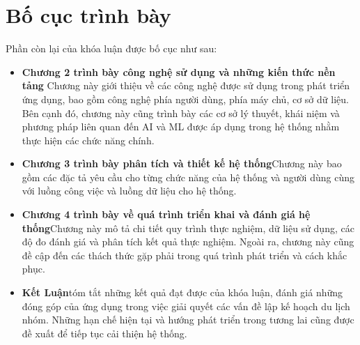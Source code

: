 \section{Bố cục trình bày}
Phần còn lại của khóa luận được bố cục như sau: 
\begin{itemize}
    \item \textbf{Chương 2 trình bày công nghệ sử dụng và những kiến thức nền tảng}\nl
    Chương này giới thiệu về các công nghệ được sử dụng trong phát triển ứng dụng, bao gồm công nghệ phía người dùng, phía máy chủ, cơ sở dữ liệu. Bên cạnh đó, chương này cũng trình bày các cơ sở lý thuyết, khái niệm và phương pháp liên quan đến AI và ML được áp dụng trong hệ thống nhằm thực hiện các chức năng chính.
    
    \item \textbf{Chương 3 trình bày phân tích và thiết kế hệ thống}\nl Chương này bao gồm các đặc tả yêu cầu cho từng chức năng của hệ thống và người dùng cùng với luồng công việc và luồng dữ liệu cho hệ thống.
    
    \item \textbf{Chương 4 trình bày về quá trình triển khai và đánh giá hệ thống}\nl Chương này mô tả chi tiết quy trình thực nghiệm, dữ liệu sử dụng, các độ đo đánh giá và phân tích kết quả thực nghiệm. Ngoài ra, chương này cũng đề cập đến các thách thức gặp phải trong quá trình phát triển và cách khắc phục.
    
    \item \textbf{Kết Luận}\nl tóm tắt những kết quả đạt được của khóa luận, đánh giá những đóng góp của ứng dụng trong việc giải quyết các vấn đề lập kế hoạch du lịch nhóm. Những hạn chế hiện tại và hướng phát triển trong tương lai cũng được đề xuất để tiếp tục cải thiện hệ thống.
\end{itemize}
